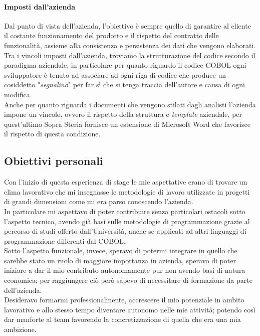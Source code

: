 	\paragraph{Imposti dall'azienda}
	\leavevmode	\newline
	\leavevmode	\newline
	Dal punto di vista dell'azienda, l'obiettivo è sempre quello di garantire al cliente il costante funzionamento del prodotto e il rispetto del contratto delle funzionalità, assieme alla consistenza e persistenza dei dati che vengono elaborati.\\
	
	Tra i vincoli imposti dall'azienda, troviamo la strutturazione del codice secondo il paradigma aziendale, in particolare per quanto riguardo il codice COBOL ogni sviluppatore è tenuto ad associare ad ogni riga di codice che produce un cosiddetto "\textit{segnalino}" per far sì che si tenga traccia dell'autore e causa di ogni modifica.\\
	
	Anche per quanto riguarda i documenti che vengono stilati dagli analisti l'azienda impone un vincolo, ovvero il rispetto della struttura e \textit{template} aziendale, per quest'ultimo Sopra Steria fornisce un estensione di Microsoft Word che favorisce il rispetto di questa condizione.

\subsection{Obiettivi personali}
\label{Obiettivi personali}
	Con l'inizio di questa esperienza di stage le mie aspettative erano di trovare un clima lavorativo che mi insegnasse le metodologie di lavoro utilizzate in progetti di grandi dimensioni come mi era parso conoscendo l'azienda.\\

	In particolare mi aspettavo di poter contribuire senza particolari ostacoli sotto l'aspetto tecnico, avendo già basi sulle metodologie di programmazione grazie al percorso di studi offerto dall'Università, anche se applicati ad altri linguaggi di programmazione differenti dal COBOL.\\
	
	Sotto l'aspetto funzionale, invece, speravo di potermi integrare in quello che sarebbe stato un ruolo di maggiore importanza in azienda, speravo di poter iniziare a dar il mio contributo autonomamente pur non avendo basi di natura economica; per raggiungere ciò però sapevo di necessitare di formazione da parte dell'azienda.\\
	
	Desideravo formarmi professionalmente, accrescere il mio potenziale in ambito lavorativo e allo stesso tempo diventare autonomo nelle mie attività; potendo così dar manforte al team favorendo la concretizzazione di quella che era una mia ambizione.